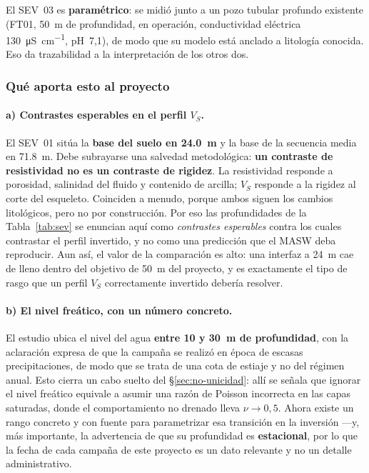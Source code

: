 El SEV~03 es \textbf{param\'etrico}: se midi\'o junto a un pozo tubular profundo existente
(FT01, \SI{50}{\meter} de profundidad, en operaci\'on, conductividad el\'ectrica
\SI{130}{\micro\siemens\per\centi\meter}, pH~7{,}1), de modo que su modelo est\'a anclado
a litolog\'ia conocida. Eso da trazabilidad a la interpretaci\'on de los otros dos.

\subsubsection{Qu\'e aporta esto al proyecto}

\paragraph{a) Contrastes esperables en el perfil $V_S$.} El SEV~01 sit\'ua la
\textbf{base del suelo en \SI{24.0}{\meter}} y la base de la secuencia media en
\SI{71.8}{\meter}. Debe subrayarse una salvedad metodol\'ogica: \textbf{un contraste de
resistividad no es un contraste de rigidez}. La resistividad responde a porosidad,
salinidad del fluido y contenido de arcilla; $V_S$ responde a la rigidez al corte del
esqueleto. Coinciden a menudo, porque ambos siguen los cambios litol\'ogicos, pero no por
construcci\'on. Por eso las profundidades de la Tabla~\ref{tab:sev} se enuncian aqu\'i como
\emph{contrastes esperables} contra los cuales contrastar el perfil invertido, y no como
una predicci\'on que el MASW deba reproducir. Aun as\'i, el valor de la comparaci\'on es
alto: una interfaz a \SI{24}{\meter} cae de lleno dentro del objetivo de
\SI{50}{\meter} del proyecto, y es exactamente el tipo de rasgo que un perfil $V_S$
correctamente invertido deber\'ia resolver.

\paragraph{b) El nivel fre\'atico, con un n\'umero concreto.} El estudio ubica el nivel
del agua \textbf{entre \SI{10}{} y \SI{30}{\meter} de profundidad}, con la aclaraci\'on
expresa de que la campa\~na se realiz\'o en \'epoca de escasas precipitaciones, de modo
que se trata de una cota de estiaje y no del r\'egimen anual. Esto cierra un cabo suelto
del \S\ref{sec:no-unicidad}: all\'i se se\~nala que ignorar el nivel fre\'atico equivale a
asumir una raz\'on de Poisson incorrecta en las capas saturadas, donde el comportamiento
no drenado lleva $\nu\to0{,}5$. Ahora existe un rango concreto y con fuente para
parametrizar esa transici\'on en la inversi\'on ---y, m\'as importante, la advertencia de
que su profundidad es \textbf{estacional}, por lo que la fecha de cada campa\~na de este
proyecto es un dato relevante y no un detalle administrativo.

